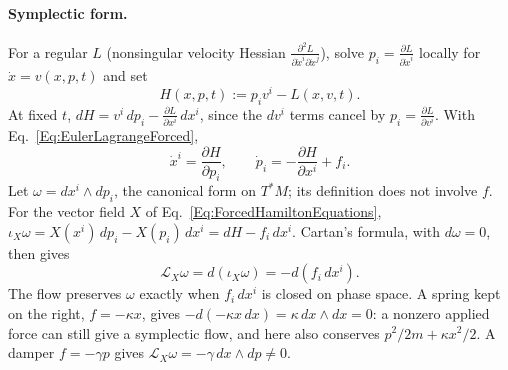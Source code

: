 \paragraph{Symplectic form.} For a regular $L$ (nonsingular velocity
Hessian $\frac{\partial^2L}{\partial\dot x^i\partial\dot x^j}$), solve
$p_i=\frac{\partial L}{\partial\dot x^i}$ locally for $\dot x=v(x,p,t)$ and set
\begin{equation}\label{Eq:LocalHamiltonianDefinition}
 H(x,p,t):=p_iv^i-L(x,v,t).
\end{equation}
At fixed $t$, $dH=v^i\,dp_i-\frac{\partial L}{\partial x^i}\,dx^i$, since the
$dv^i$ terms cancel by $p_i=\frac{\partial L}{\partial v^i}$. With
Eq.~\ref{Eq:EulerLagrangeForced},
\begin{equation}\label{Eq:ForcedHamiltonEquations}
 \dot x^i=\frac{\partial H}{\partial p_i},\qquad
 \dot p_i=-\frac{\partial H}{\partial x^i}+f_i .
\end{equation}
Let $\omega=dx^i\wedge dp_i$, the canonical form on $T^*M$; its definition
does not involve $f$. For the vector field $X$ of
Eq.~\ref{Eq:ForcedHamiltonEquations},
$\iota_X\omega=X(x^i)\,dp_i-X(p_i)\,dx^i=dH-f_i\,dx^i$. Cartan's formula,
with $d\omega=0$, then gives
\begin{equation}\label{Eq:ForcedSymplecticBalance}
 \mathcal L_X\omega=d(\iota_X\omega)=-d(f_i\,dx^i).
\end{equation}
The flow preserves $\omega$ exactly when $f_i\,dx^i$ is closed on phase
space. A spring kept on the right, $f=-\kappa x$, gives
$-d(-\kappa x\,dx)=\kappa\,dx\wedge dx=0$: a nonzero applied force can still
give a symplectic flow, and here also conserves $p^2/2m+\kappa x^2/2$.
A damper $f=-\gamma p$ gives
$\mathcal L_X\omega=-\gamma\,dx\wedge dp\ne0$.

